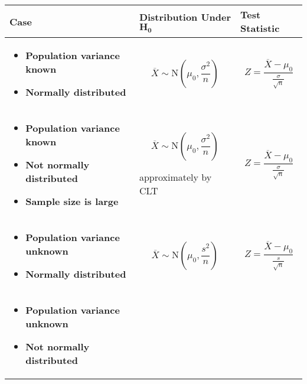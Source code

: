 \documentclass[11pt,a4paper]{book}
\begin{document}
\begin{center}
\begin{tabular}{|>{\raggedright}m{5.6cm}|>{\centering}m{5cm}|>{\centering}m{5cm}|}
\hline 
\hspace{2.5cm}\textbf{Case} & \textbf{Distribution Under }$\boldsymbol{H_{0}}$ & \textbf{Test Statistic}\tabularnewline
\hline 
\begin{itemize}[leftmargin=0.5cm]

\item \textbf{Population variance known}

\item \textbf{Normally distributed}

\end{itemize} & 
\[
\overline{X}\sim\text{N}\left(\mu_{0},\frac{\sigma^{2}}{n}\right)
\]
 & 
\[
{\displaystyle Z=\frac{\overline{X}-\mu_{0}}{\frac{\sigma}{\sqrt{n}}}}
\]
\tabularnewline
\hline 
\begin{itemize}[leftmargin=0.5cm]

\item \textbf{Population variance known}

\item \textbf{Not normally distributed} 

\item \textbf{Sample size is large}

\end{itemize} & 
\[
\overline{X}\sim\text{N}\left(\mu_{0},\frac{\sigma^{2}}{n}\right)
\]

approximately by CLT & 
\[
{\displaystyle Z=\frac{\overline{X}-\mu_{0}}{\frac{\sigma}{\sqrt{n}}}}
\]
\tabularnewline
\hline 
\begin{itemize}[leftmargin=0.5cm]

\item \textbf{Population variance unknown}

\item \textbf{Normally distributed}

\end{itemize} & 
\[
\overline{X}\sim\text{N}\left(\mu_{0},\frac{s^{2}}{n}\right)
\]
 & 
\[
{\displaystyle Z=\frac{\overline{X}-\mu_{0}}{\frac{s}{\sqrt{n}}}}
\]
\tabularnewline
\hline 
\begin{itemize}[leftmargin=0.5cm]

\item \textbf{Population variance unknown }

\item \textbf{Not normally distributed }


\end{itemize}
\end{tabular}
\end{center}
\end{document}
